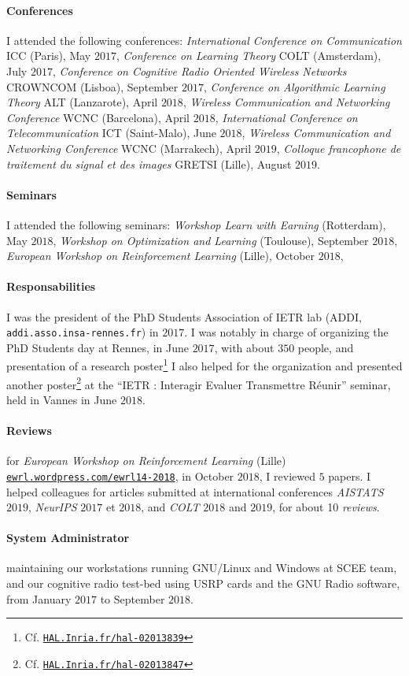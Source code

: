 \paragraph{Conferences}
    I attended the following conferences:
	\emph{International Conference on Communication} ICC (Paris), May $2017$,
    \emph{Conference on Learning Theory} COLT (Amsterdam), July $2017$,
    \emph{Conference on Cognitive Radio Oriented Wireless Networks} CROWNCOM (Lisboa), September $2017$,
    \emph{Conference on Algorithmic Learning Theory} ALT (Lanzarote), April $2018$,
    \emph{Wireless Communication and Networking Conference} WCNC (Barcelona), April $2018$,
	\emph{International Conference on Telecommunication} ICT (Saint-Malo), June $2018$,
    \emph{Wireless Communication and Networking Conference} WCNC (Marrakech), April $2019$,
    \emph{Colloque francophone de traitement du signal et des images} GRETSI (Lille), August $2019$.

\paragraph{Seminars}
    I attended the following seminars:
	\emph{Workshop Learn with Earning} (Rotterdam), May $2018$,
	\emph{Workshop on Optimization and Learning} (Toulouse), September $2018$,
	\emph{European Workshop on Reinforcement Learning} (Lille), October $2018$,

\paragraph{Responsabilities}
    I was the president of the PhD Students Association of IETR lab (ADDI, \texttt{addi.asso.insa-rennes.fr}) in $2017$.
    I was notably in charge of organizing the PhD Students day at Rennes, in June $2017$, with about $350$ people, and presentation of a research poster\footnote{Cf. \href{https://HAL.Inria.fr/hal-02013839}{\texttt{HAL.Inria.fr/hal-02013839}}}
    I also helped for the organization and presented another poster\footnote{Cf. \href{https://HAL.Inria.fr/hal-02013847}{\texttt{HAL.Inria.fr/hal-02013847}}} at the ``IETR : Interagir Evaluer Transmettre Réunir'' seminar, held in Vannes in June $2018$.

\paragraph{Reviews}
	for \emph{European Workshop on Reinforcement Learning} (Lille) \href{https://ewrl.wordpress.com/ewrl14-2018}{\texttt{ewrl.wordpress.com/ewrl14-2018}}, in October $2018$, I reviewed $5$ papers.
	I helped colleagues for articles submitted at international conferences \emph{AISTATS} $2019$, \emph{NeurIPS} $2017$ et $2018$, and \emph{COLT} $2018$ and $2019$, for about 10 \emph{reviews}.

\paragraph{System Administrator}
	maintaining our workstations running GNU/Linux and Windows
	at SCEE team,
	and our cognitive radio test-bed using USRP cards and the GNU Radio software,
	from January $2017$ to September $2018$.

